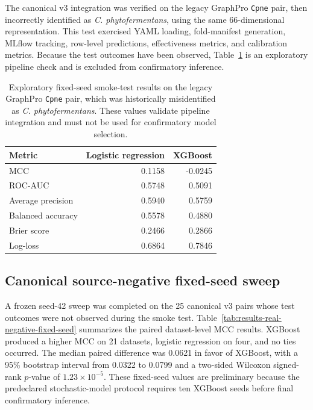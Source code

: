 The canonical v3 integration was verified on the legacy GraphPro
\texttt{Cpne} pair, then incorrectly identified as \textit{C.
phytofermentans}, using the same 66-dimensional representation.
This test exercised YAML loading, fold-manifest generation, MLflow tracking,
row-level predictions, effectiveness metrics, and calibration metrics. Because
the test outcomes have been observed, Table~\ref{tab:results-real-negative-smoke}
is an exploratory pipeline check and is excluded from confirmatory inference.

\begin{table}[htbp]
  \centering
  \caption{Exploratory fixed-seed smoke-test results on the legacy GraphPro \texttt{Cpne} pair, which was historically misidentified as \textit{C. phytofermentans}. These values validate pipeline integration and must not be used for confirmatory model selection.}
  \label{tab:results-real-negative-smoke}
  \begin{tabular}{lrr}
    \toprule
    Metric & Logistic regression & XGBoost \\
    \midrule
    MCC & 0.1158 & -0.0245 \\
    ROC-AUC & 0.5748 & 0.5091 \\
    Average precision & 0.5940 & 0.5759 \\
    Balanced accuracy & 0.5578 & 0.4880 \\
    Brier score & 0.2466 & 0.2866 \\
    Log-loss & 0.6864 & 0.7846 \\
    \bottomrule
  \end{tabular}
\end{table}

\subsection{Canonical source-negative fixed-seed sweep}

A frozen seed-42 sweep was completed on the 25 canonical v3 pairs whose test
outcomes were not observed during the smoke test. Table~\ref{tab:results-real-negative-fixed-seed}
summarizes the paired dataset-level MCC results. XGBoost produced a higher MCC
on 21 datasets, logistic regression on four, and no ties occurred. The median
paired difference was 0.0621 in favor of XGBoost, with a 95\% bootstrap interval
from 0.0322 to 0.0799 and a two-sided Wilcoxon signed-rank $p$-value of
$1.23\times10^{-5}$. These fixed-seed values are preliminary because the
predeclared stochastic-model protocol requires ten XGBoost seeds before final
confirmatory inference.

